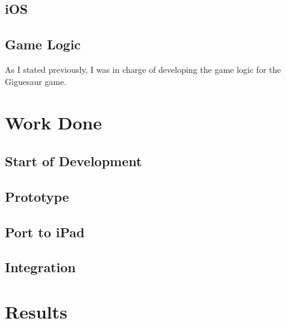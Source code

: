 \documentclass{article}
\begin{document}
\subsection{iOS}


\subsection{Game Logic}
As I stated previously, I was in charge of developing the game logic for the Giguesaur game.


\section{Work Done}

\subsection{Start of Development}

\subsection{Prototype}

\subsection{Port to iPad}

\subsection{Integration}


\section{Results}

\end{document}
